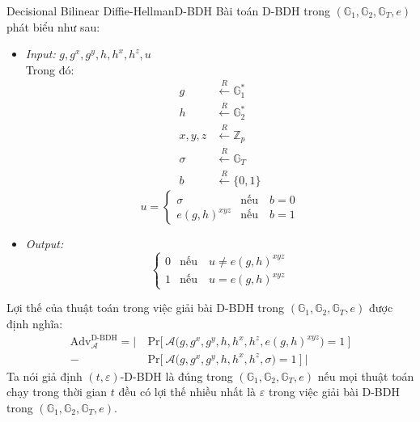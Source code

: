 \documentclass[class=report, crop=false]{standalone}
\begin{document}
		\begin{problem}{Decisional Bilinear Diffie-Hellman}{D-BDH}
			Bài toán D-BDH trong $(\mathbb{G}_1, \mathbb{G}_2, \mathbb{G}_T, e)$ phát biểu như sau:
			\vspace{-\baselineskip}
			\begin{itemize}[leftmargin=1.5cm, itemindent=-0.5cm]
				\item[] \textit{Input:} $g, g^x, g^y, h, h^x, h^z, u$ \\
				Trong đó: \vspace{-\baselineskip}
				\begin{align*}
					g 			&\xleftarrow{R} \mathbb{G}_1^* 	\\
					h 			&\xleftarrow{R} \mathbb{G}_2^* 	\\
					x, y, z 	&\xleftarrow{R} \mathbb{Z}_p 	\\
					\sigma 		&\xleftarrow{R} \mathbb{G}_T 	\\
					b 			&\xleftarrow{R} \{ 0, 1 \}
				\end{align*}
				\[
					u = \begin{cases}
						\sigma 			&\text{nếu}\quad b = 0 \\
						e(g, h)^{xyz} 	&\text{nếu}\quad b = 1
					\end{cases}
				\]
				\item[] \textit{Output:}
				\[
					\begin{cases}
						0 &\text{nếu}\quad u \neq e(g, h)^{xyz} \\
						1 &\text{nếu}\quad u = e(g, h)^{xyz}
					\end{cases}
				\]
			\end{itemize}
			\vspace{-\baselineskip}\par
			Lợi thế của thuật toán \algo trong việc giải bài D-BDH trong $(\mathbb{G}_1, \mathbb{G}_2, \mathbb{G}_T, e)$ được định nghĩa:
			\begin{equation*}
				\begin{split}
					\text{Adv}_{\mathcal{A}}^{\text{D-BDH}} = \Bigg|\ &\text{Pr}\bigg[ \ \mathcal{A}\Big(g, g^x, g^y, h, h^x, h^z, e(g, h)^{xyz} \Big) = 1 \ \bigg] \\
					- &\text{Pr}\bigg[ \ \mathcal{A}\Big(g, g^x, g^y, h, h^x, h^z, \sigma \Big) = 1 \ \bigg]\ \Bigg|
				\end{split}
			\end{equation*} \indent
			Ta nói giả định $(t, \varepsilon)$-D-BDH là đúng trong $(\mathbb{G}_1, \mathbb{G}_2, \mathbb{G}_T, e)$ nếu mọi thuật toán chạy trong thời gian $t$ đều có lợi thế nhiều nhất là $\varepsilon$ trong việc giải bài D-BDH trong $(\mathbb{G}_1, \mathbb{G}_2, \mathbb{G}_T, e)$.
		\end{problem}
\end{document}
